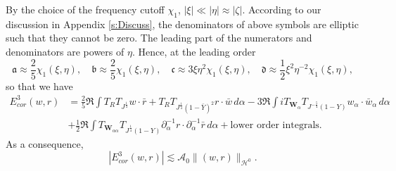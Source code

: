 \documentclass[10pt]{amsart}
\theoremstyle{remark}
\theoremstyle{definition}
\numberwithin{equation}{section}
\newcommand{\p}{\partial}
\renewcommand{\H}{{\mathcal H }}
\newcommand{\al}{\alpha}
\newcommand{\f}{\frac}
\newcommand{\bw}{\mathbf{W}}
\newcommand{\CalAZ}{{\mathcal{A}_0}}
\begin{document}
By the choice of the frequency cutoff $\chi_1$, $|\xi|\ll |\eta| \approx |\zeta|$.
According to our discussion in Appendix \ref{s:Discuss}, the denominators of above symbols are elliptic such that they cannot be zero.
The leading part of the numerators and denominators are powers of $\eta$.
Hence, at the leading order
\begin{equation*}
\mathfrak{a} \approx \f25\chi_1(\xi, \eta), \quad \mathfrak{b} \approx  \f25\chi_1(\xi, \eta), \quad \mathfrak{c} \approx 3\xi\eta^2 \chi_1(\xi, \eta), \quad \mathfrak{d} \approx \f{1}{2}\xi^2\eta^{-2}\chi_1(\xi, \eta),
\end{equation*}
so that we have
\begin{align*}
 E^3_{cor}(w,r) &= \f25\Re \int  T_R T_{J^\f14}w\cdot\bar{r} + T_R T_{J^{\frac{1}{4}}(1-\bar{Y})^2}r\cdot \bar{w} \,d\al -3\Re \int iT_{\bw_\al}T_{J^{-\f54}(1-Y)}w_\al \cdot \bar{w}_{\al }\,d\al\\
 & + \f12 \Re \int T_{\bw_{\al\al}} T_{J^\f14(1-Y)}\p_\al^{-1}r\cdot \p_\al^{-1}\bar{r} \,d\al + \text{lower order integrals}.
\end{align*}
As a consequence, 
\begin{equation*}
    |E^3_{cor}(w,r)| \lesssim \CalAZ \|(w,r)\|_{\H^0}.
\end{equation*}
\end{document}
